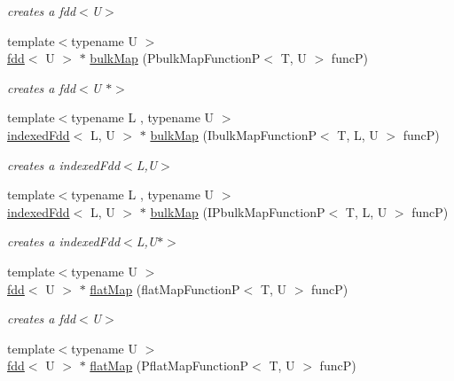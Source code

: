 \begin{DoxyCompactItemize}
\begin{DoxyCompactList}\small\item\em creates a fdd$<$\+U$>$ \end{DoxyCompactList}\item 
{\footnotesize template$<$typename U $>$ }\\\hyperlink{classfaster_1_1fdd}{fdd}$<$ U $>$ $\ast$ \hyperlink{group__bulk_ga72e07b032ee97aeed0261a20769720a7}{bulk\+Map} (Pbulk\+Map\+FunctionP$<$ T, U $>$ funcP)
\begin{DoxyCompactList}\small\item\em creates a fdd$<$\+U $\ast$$>$ \end{DoxyCompactList}\item 
{\footnotesize template$<$typename L , typename U $>$ }\\\hyperlink{classfaster_1_1indexedFdd}{indexed\+Fdd}$<$ L, U $>$ $\ast$ \hyperlink{group__bulk_ga97ad1e63823abe30de230da1456481d4}{bulk\+Map} (Ibulk\+Map\+FunctionP$<$ T, L, U $>$ funcP)
\begin{DoxyCompactList}\small\item\em creates a indexed\+Fdd$<$\+L,\+U$>$ \end{DoxyCompactList}\item 
{\footnotesize template$<$typename L , typename U $>$ }\\\hyperlink{classfaster_1_1indexedFdd}{indexed\+Fdd}$<$ L, U $>$ $\ast$ \hyperlink{group__bulk_gabfd585e52364a7be20125aa25c0ab141}{bulk\+Map} (I\+Pbulk\+Map\+FunctionP$<$ T, L, U $>$ funcP)
\begin{DoxyCompactList}\small\item\em creates a indexed\+Fdd$<$\+L,\+U$\ast$$>$ \end{DoxyCompactList}\item 
{\footnotesize template$<$typename U $>$ }\\\hyperlink{classfaster_1_1fdd}{fdd}$<$ U $>$ $\ast$ \hyperlink{group__flatmap_ga7efd43be1d3005d654c4656d521faf30}{flat\+Map} (flat\+Map\+FunctionP$<$ T, U $>$ funcP)
\begin{DoxyCompactList}\small\item\em creates a fdd$<$\+U$>$ \end{DoxyCompactList}\item 
{\footnotesize template$<$typename U $>$ }\\\hyperlink{classfaster_1_1fdd}{fdd}$<$ U $>$ $\ast$ \hyperlink{group__flatmap_ga3f353414307512c23d88fc3e8b2e8221}{flat\+Map} (Pflat\+Map\+FunctionP$<$ T, U $>$ funcP)

\end{DoxyCompactItemize}
